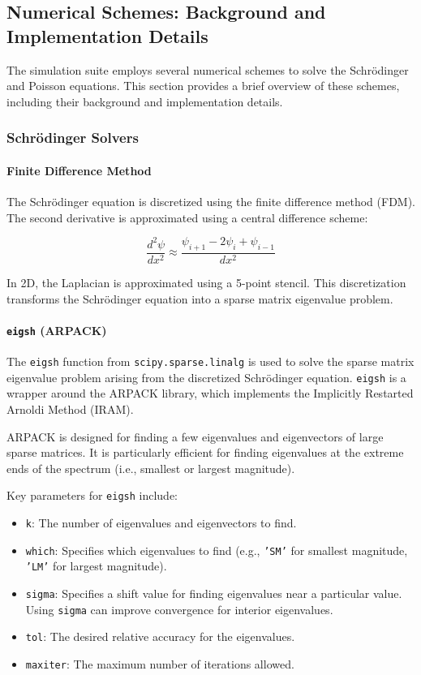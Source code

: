 \documentclass{article}
\begin{document}
\subsection{Numerical Schemes: Background and Implementation Details}

The simulation suite employs several numerical schemes to solve the Schrödinger and Poisson equations. This section provides a brief overview of these schemes, including their background and implementation details.

\subsubsection{Schrödinger Solvers}

\paragraph{Finite Difference Method}
The Schrödinger equation is discretized using the finite difference method (FDM). The second derivative is approximated using a central difference scheme:

\[
	\frac{d^2\psi}{dx^2} \approx \frac{\psi_{i+1} - 2\psi_i + \psi_{i-1}}{dx^2}
\]

In 2D, the Laplacian is approximated using a 5-point stencil. This discretization transforms the Schrödinger equation into a sparse matrix eigenvalue problem.

\paragraph{\texttt{eigsh} (ARPACK)}
The \texttt{eigsh} function from \texttt{scipy.sparse.linalg} is used to solve the sparse matrix eigenvalue problem arising from the discretized Schrödinger equation. \texttt{eigsh} is a wrapper around the ARPACK library, which implements the Implicitly Restarted Arnoldi Method (IRAM).

ARPACK is designed for finding a few eigenvalues and eigenvectors of large sparse matrices. It is particularly efficient for finding eigenvalues at the extreme ends of the spectrum (i.e., smallest or largest magnitude).

Key parameters for \texttt{eigsh} include:
\begin{itemize}
	\item \texttt{k}: The number of eigenvalues and eigenvectors to find.
	\item \texttt{which}: Specifies which eigenvalues to find (e.g., \texttt{'SM'} for smallest magnitude, \texttt{'LM'} for largest magnitude).
	\item \texttt{sigma}: Specifies a shift value for finding eigenvalues near a particular value. Using \texttt{sigma} can improve convergence for interior eigenvalues.
	\item \texttt{tol}: The desired relative accuracy for the eigenvalues.
	\item \texttt{maxiter}: The maximum number of iterations allowed.
\end{itemize}
\end{document}
